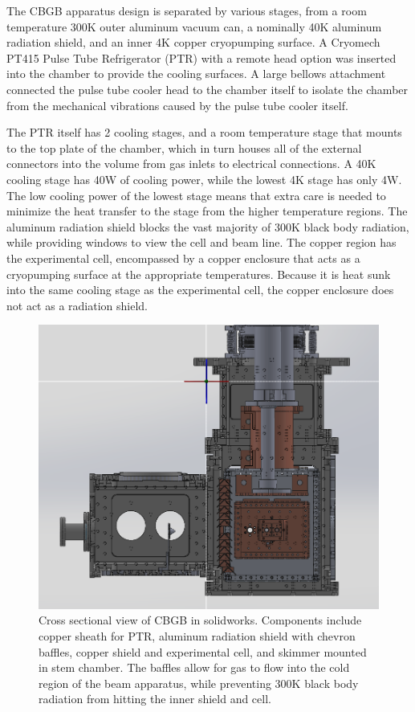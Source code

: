 The CBGB apparatus design is separated by various stages, from a room temperature 300K outer aluminum vacuum can, a nominally 40K aluminum radiation shield, and an inner 4K copper cryopumping surface. A Cryomech PT415 Pulse Tube Refrigerator (PTR) with a remote head option was inserted into the chamber to provide the cooling surfaces. A large bellows attachment connected the pulse tube cooler head to the chamber itself to isolate the chamber from the mechanical vibrations caused by the pulse tube cooler itself.

The PTR itself has 2 cooling stages, and a room temperature stage that mounts to the top plate of the chamber, which in turn houses all of the external connectors into the volume from gas inlets to electrical connections. A 40K cooling stage has 40W of cooling power, while the lowest 4K stage has only 4W. The low cooling power of the lowest stage means that extra care is needed to minimize the heat transfer to the stage from the higher temperature regions. The aluminum radiation shield blocks the vast majority of 300K black body radiation, while providing windows to view the cell and beam line. The copper region has the experimental cell, encompassed by a copper enclosure that acts as a cryopumping surface at the appropriate temperatures. Because it is heat sunk into the same cooling stage as the experimental cell, the copper enclosure does not act as a radiation shield.

\begin{figure}[H]
	\centering
	\includegraphics[width=1\textwidth]{images/CBGB_solidworks_cross_section.png}
	\caption{Cross sectional view of CBGB in solidworks. Components include copper sheath for PTR, aluminum radiation shield with chevron baffles, copper shield and experimental cell, and skimmer mounted in stem chamber. The baffles allow for gas to flow into the cold region of the beam apparatus, while preventing 300K black body radiation from hitting the inner shield and cell.}
	\label{fig: SW chamber}
\end{figure}

